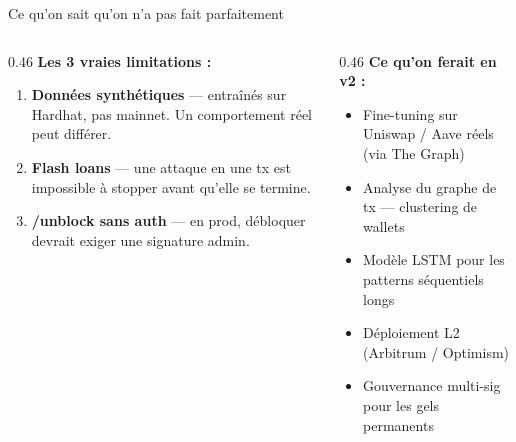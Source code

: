 \documentclass[aspectratio=169,12pt]{beamer}
\newenvironment{tightitemize}{%
  \setlength{\topsep}{1pt}\setlength{\partopsep}{0pt}%
  \begin{itemize}\setlength{\itemsep}{1pt}\setlength{\parskip}{0pt}}{\end{itemize}}
\begin{document}
\begin{frame}{Ce qu'on sait qu'on n'a pas fait parfaitement}
  \begin{columns}[T]
    \begin{column}{0.46\textwidth}
      \textbf{Les 3 vraies limitations :}\\[0.1cm]
      \begin{enumerate}
        \item \textbf{Données synthétiques} --- entraînés sur Hardhat, pas mainnet. Un comportement réel peut différer.\\[0.1cm]
        \item \textbf{Flash loans} --- une attaque en une tx est impossible à stopper avant qu'elle se termine.\\[0.1cm]
        \item \textbf{/unblock sans auth} --- en prod, débloquer devrait exiger une signature admin.
      \end{enumerate}
    \end{column}
    \begin{column}{0.46\textwidth}
      \textbf{Ce qu'on ferait en v2 :}\\[0.15cm]
      \begin{tightitemize}
        \item Fine-tuning sur Uniswap / Aave réels (via The Graph)
        \item Analyse du graphe de tx --- clustering de wallets
        \item Modèle LSTM pour les patterns séquentiels longs
        \item Déploiement L2 (Arbitrum / Optimism)
        \item Gouvernance multi-sig pour les gels permanents
      \end{tightitemize}
    \end{column}
  \end{columns}
\end{frame}
\end{document}
